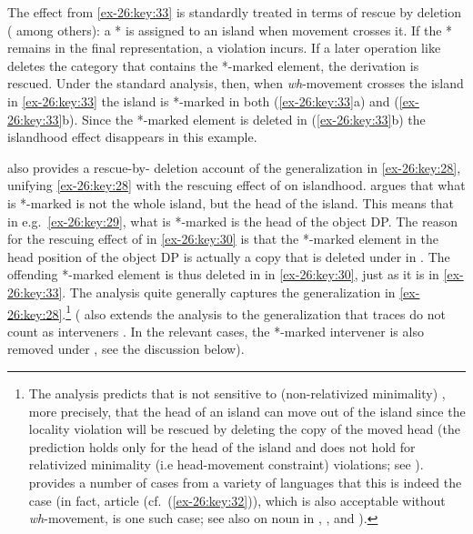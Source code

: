 \documentclass[output=paper]{langsci/langscibook}
\begin{document}
\ea\label{ex-26:key:33}
    \hfill\parencite[276]{Ross1969}
    \z
\z

The effect from \eqref{ex-26:key:33} is standardly treated in terms of rescue by  deletion
(\citealt{Chomsky:1972,Merchant2001,Lasnik2001,FoxLas2003,HorLasUr2003,%
BoeLas2006,Boskovic2011} among others): a * is assigned to an island when
movement crosses it. If the * remains in the final  representation, a
violation incurs. If a later operation like  deletes the category that
contains the *-marked element, the derivation is rescued.  Under the standard
analysis, then, when \emph{wh}-movement crosses the island in \eqref{ex-26:key:33} the island
is *-marked in both (\ref{ex-26:key:33}a) and (\ref{ex-26:key:33}b). Since the *-marked element is deleted in
(\ref{ex-26:key:33}b) the islandhood effect disappears in this example.

\textcite{Boskovic2011,Boskovic2013b} also provides a
rescue-by- deletion account of the generalization in \eqref{ex-26:key:28},
unifying \eqref{ex-26:key:28} with the rescuing effect of  on islandhood.
\citeauthor{Boskovic2011} argues that what is *-marked is not the whole island,
but the head of the island. This means that in e.g.\ \eqref{ex-26:key:29}, what is *-marked is
the head of the object DP. The reason for the rescuing effect of 
in \eqref{ex-26:key:30} is that the *-marked element in the head position of the object DP is
actually a copy that is deleted under  in . The
offending *-marked element is thus deleted in  in \eqref{ex-26:key:30}, just
as it is in \eqref{ex-26:key:33}. The analysis quite generally captures the generalization in
\eqref{ex-26:key:28}.\footnote{The analysis predicts that  is not sensitive to
    (non-relativized minimality) , more precisely, that the head
    of an island can move out of the island since the locality violation will
    be rescued by deleting the copy of the moved head (the prediction holds
    only for the head of the island and does not hold for relativized
    minimality (i.e head-movement constraint) violations; see
    \citealt{Boskovic2013b}). \textcite{Boskovic2013b} provides a number of
    cases from a variety of languages that this is indeed the case (in fact,
     article  (cf.\ (\ref{ex-26:key:32})), which is also
    acceptable without \emph{wh}-movement, is one such case; see also
\citealt{Boskovic2013b} on noun  in ,
, and ).} (\citealt{Boskovic2011} also extends
the analysis to the generalization that traces do not count as interveners
\parencite{Chomsky1995}.  In the relevant cases, the *-marked intervener is
also removed under  , see the discussion below).
\end{document}
